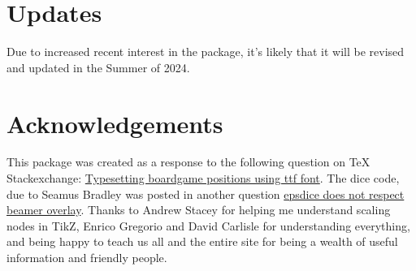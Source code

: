 \documentclass[11pt]{article}
\begin{document}
\section{Updates}
Due to increased recent interest in the package, it's likely that it will be revised and updated in the Summer of 2024.

\section{Acknowledgements}
This package was created as a response to the following question on TeX Stackexchange: \href{http://tex.stackexchange.com/q/48591/2693}{Typesetting boardgame positions using ttf font}.  The dice code, due to Seamus Bradley was posted in another question \href{http://tex.stackexchange.com/a/41628/2693}{epsdice does not respect beamer overlay}. Thanks to Andrew Stacey for helping me understand scaling nodes in TikZ, Enrico Gregorio and David Carlisle for understanding everything, and being happy to teach us all and the entire site for being a wealth of useful information and friendly people.
\end{document}
